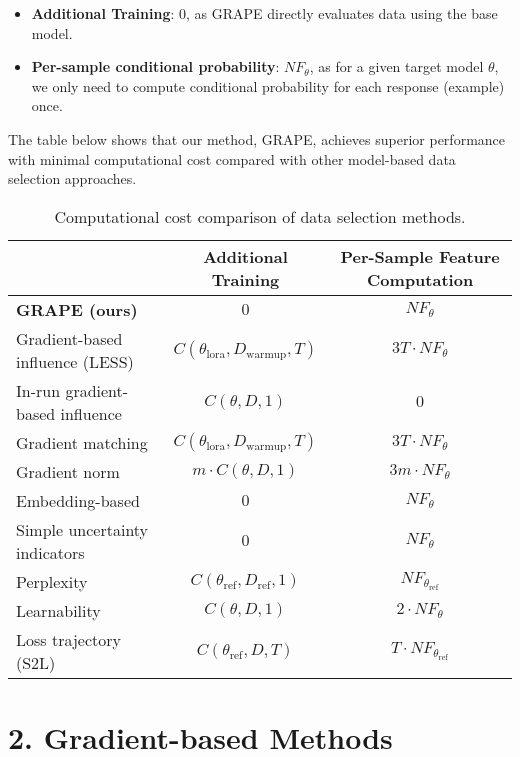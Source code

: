 \begin{itemize}
    \item \textbf{Additional Training}: 0, as GRAPE directly evaluates data using the base model.
    \item \textbf{Per-sample conditional probability}: $NF_{\theta}$, as for a given target model $\theta$, we only need to compute conditional probability for each response (example) once.
\end{itemize}

The table below shows that our method, GRAPE, achieves superior performance with minimal computational cost compared with other model-based data selection approaches.

\begin{table}[h]
    \centering
    \begin{tabular}{@{}lcc@{}}
        \toprule
        & \textbf{Additional Training} & \textbf{Per-Sample Feature Computation} \\
        \midrule
        \textbf{GRAPE (ours)} & $0$ & $NF_{\theta}$ \\
        Gradient-based influence (LESS) & $C(\theta_{\text{lora}}, D_{\text{warmup}}, T)$ & $3T \cdot NF_{\theta}$ \\
        In-run gradient-based influence & $C(\theta, D, 1)$ & $0$ \\
        Gradient matching & $C(\theta_{\text{lora}}, D_{\text{warmup}}, T)$ & $3T \cdot NF_{\theta}$ \\
        Gradient norm & $m \cdot C(\theta, D, 1)$ & $3m \cdot NF_{\theta}$ \\
        Embedding-based & $0$ & $NF_{\theta}$ \\
        Simple uncertainty indicators & $0$ & $NF_{\theta}$ \\
        Perplexity & $C(\theta_{\text{ref}}, D_{\text{ref}}, 1)$ & $NF_{\theta_{\text{ref}}}$ \\
        Learnability & $C(\theta, D, 1)$ & $2 \cdot NF_{\theta}$ \\
        Loss trajectory (S2L) & $C(\theta_{\text{ref}}, D, T)$ & $T \cdot NF_{\theta_{\text{ref}}}$ \\
        \bottomrule
    \end{tabular}
    \caption{Computational cost comparison of data selection methods.}
\end{table}

\section*{2. Gradient-based Methods}

